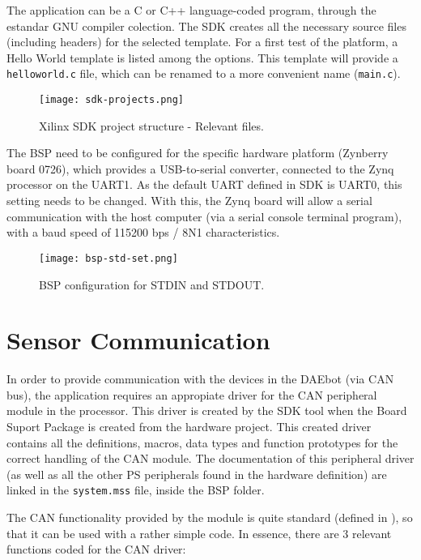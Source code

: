 The application can be a C or C++ language-coded program, through the estandar GNU compiler colection. The SDK creates all the necessary source files (including headers) for the selected template. For a first test of the platform, a Hello World template\cite{wiki} is listed among the options. This template will provide a \texttt{helloworld.c} file, which can be renamed to a more convenient name (\texttt{main.c}).

\begin{figure}[h!]
	\centering
	\texttt{[image: sdk-projects.png]}
	\caption{Xilinx SDK project structure - Relevant files.}
	\label{fig:sdk-project}
\end{figure}

The BSP need to be configured for the specific hardware platform (Zynberry board 0726), which provides a USB-to-serial converter, connected to the Zynq processor on the UART1. As the default UART defined in SDK is UART0, this setting needs to be changed. With this, the Zynq board will allow a serial communication with the host computer (via a serial console terminal program), with a baud speed of 115200 bps / 8N1 characteristics.

\begin{figure}[h!]
	\centering
	\texttt{[image: bsp-std-set.png]}
	\caption{BSP configuration for STDIN and STDOUT.}
	\label{fig:bsp-std-set}
\end{figure}

\section{Sensor Communication} \label{sensorcom}

In order to provide communication with the devices in the DAEbot (via CAN bus), the application requires an appropiate driver for the CAN peripheral module in the processor. This driver is created by the SDK tool when the Board Suport Package is created from the hardware project. This created driver contains all the definitions, macros, data types and function prototypes for the correct handling of the CAN module. The documentation of this peripheral driver (as well as all the other PS peripherals found in the hardware definition) are linked in the \texttt{system.mss} file, inside the BSP folder.

The CAN functionality provided by the module is quite standard (defined in \cite{can}), so that it can be used with a rather simple code. In essence, there are 3 relevant functions coded for the CAN driver:

